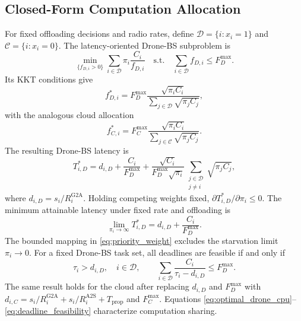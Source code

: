 \IfFileExists{IEEEtran.cls}{\documentclass[conference]{IEEEtran}}{\documentclass[10pt,twocolumn]{article}}
\newcommand{\Dset}{\mathcal{D}}
\newcommand{\Cset}{\mathcal{C}}
\begin{document}
\subsection{Closed-Form Computation Allocation}
For fixed offloading decisions and radio rates, define $\Dset=\{i:x_i=1\}$ and $\Cset=\{i:x_i=0\}$. The latency-oriented Drone-BS subproblem is
\begin{equation}
    \min_{\{f_{D,i}>0\}}
    \sum_{i\in\Dset}\pi_i\frac{C_i}{f_{D,i}}
    \quad\mathrm{s.t.}\quad
    \sum_{i\in\Dset}f_{D,i}\leq F_D^{\max}.
\end{equation}
Its KKT conditions give
\begin{equation}
    f_{D,i}^{*}
    =F_D^{\max}
    \frac{\sqrt{\pi_iC_i}}
    {\sum_{j\in\Dset}\sqrt{\pi_jC_j}},
    \label{eq:optimal_drone_cpu}
\end{equation}
with the analogous cloud allocation
\begin{equation}
    f_{C,i}^{*}
    =F_C^{\max}
    \frac{\sqrt{\pi_iC_i}}
    {\sum_{j\in\Cset}\sqrt{\pi_jC_j}}.
\end{equation}
The resulting Drone-BS latency is
\begin{equation}
    T_{i,D}^{*}
    =d_{i,D}+\frac{C_i}{F_D^{\max}}
    +\frac{\sqrt{C_i}}{F_D^{\max}\sqrt{\pi_i}}
    \sum_{\substack{j\in\Dset\\j\neq i}}\sqrt{\pi_jC_j},
    \label{eq:priority_delay}
\end{equation}
where $d_{i,D}=s_i/R_i^{\mathrm{G2A}}$. Holding competing weights fixed, $\partial T_{i,D}^{*}/\partial\pi_i\leq0$. The minimum attainable latency under fixed rate and offloading is
\begin{equation}
    \lim_{\pi_i\rightarrow\infty}T_{i,D}^{*}
    =d_{i,D}+\frac{C_i}{F_D^{\max}}.
\end{equation}
The bounded mapping in \eqref{eq:priority_weight} excludes the starvation limit $\pi_i\rightarrow0$. For a fixed Drone-BS task set, all deadlines are feasible if and only if
\begin{equation}
    \tau_i>d_{i,D},\quad i\in\Dset,
    \qquad
    \sum_{i\in\Dset}\frac{C_i}{\tau_i-d_{i,D}}\leq F_D^{\max}.
    \label{eq:deadline_feasibility}
\end{equation}
The same result holds for the cloud after replacing $d_{i,D}$ and $F_D^{\max}$ with $d_{i,C}=s_i/R_i^{\mathrm{G2A}}+s_i/R_i^{\mathrm{A2S}}+T_{\mathrm{prop}}$ and $F_C^{\max}$. Equations \eqref{eq:optimal_drone_cpu}--\eqref{eq:deadline_feasibility} characterize computation sharing.
\end{document}

